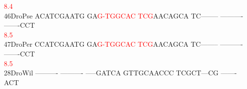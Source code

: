 \documentclass[11pt,twoside,reqno,a4paper]{article}
\begin{document}
{\hspace*{4\charwidth}\hspace*{7\charwidth}\hspace*{0\charwidth}\textcolor{Red}{8.4}\hspace*{1\charwidth}\hspace*{1\charwidth}\hspace*{1\charwidth}\hspace*{1\charwidth}\hspace*{1\charwidth}\hspace*{1\charwidth}\\
46\hspace*{2\charwidth}DroPse	ACATCGAATG	GA\textcolor{Red}{G}\textcolor{Red}{-}\textcolor{Red}{T}\textcolor{Red}{G}\textcolor{Red}{G}\textcolor{Red}{C}\textcolor{Red}{A}\textcolor{Red}{C}	\textcolor{Red}{T}\textcolor{Red}{C}\textcolor{Red}{G}AACAGCA	TC--------	----------	-------CCT	\\
\hspace*{4\charwidth}\hspace*{7\charwidth}\hspace*{1\charwidth}\hspace*{12\charwidth}\textcolor{Red}{8.5}\hspace*{1\charwidth}\hspace*{1\charwidth}\hspace*{1\charwidth}\hspace*{1\charwidth}\hspace*{1\charwidth}\\
47\hspace*{2\charwidth}DroPer	CCATCGAATG	GA\textcolor{Red}{G}\textcolor{Red}{-}\textcolor{Red}{T}\textcolor{Red}{G}\textcolor{Red}{G}\textcolor{Red}{C}\textcolor{Red}{A}\textcolor{Red}{C}	\textcolor{Red}{T}\textcolor{Red}{C}\textcolor{Red}{G}AACAGCA	TC--------	----------	-------CCT	\\
\hspace*{4\charwidth}\hspace*{7\charwidth}\hspace*{1\charwidth}\hspace*{12\charwidth}\textcolor{Red}{8.5}\hspace*{1\charwidth}\hspace*{1\charwidth}\hspace*{1\charwidth}\hspace*{1\charwidth}\hspace*{1\charwidth}\\
28\hspace*{2\charwidth}DroWil	----------	----------	-----GATCA	GTTGCAACCC	TCGCT---CG	-------ACT	\\
}
\end{document}
